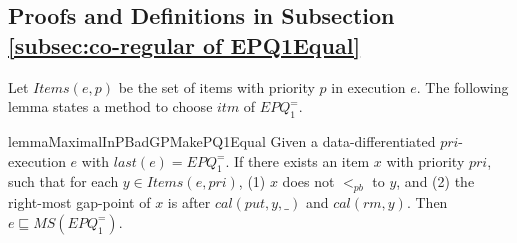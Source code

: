 \subsection{Proofs and Definitions in Subsection \ref{subsec:co-regular of EPQ1Equal}}
\label{sec:appendix proof and definition in section co-regular of EPQ1Equal}

Let $\textit{Items}(e,p)$ be the set of items with priority $p$ in execution $e$. The following lemma states a method to choose $\textit{itm}$ of $\textit{EPQ}_1^{=}$.

\begin{restatable}{lemma}{MaximalInPBadGPMakePQ1Equal}
\label{lemma:maximal in pb and gap-point make a candidate of EPQ1Equal}
Given a data-differentiated $\textit{pri}$-execution $e$ with $\textit{last}(e) = \textit{EPQ}_1^{=}$. If there exists an item $x$ with priority $\textit{pri}$, such that for each $y \in \textit{Items}(e,\textit{pri})$, (1) $x$ does not $<_{\textit{pb}}$ to $y$, and (2) the right-most gap-point of $x$ is after $\textit{cal}(\textit{put},y,\_)$ and $\textit{cal}(\textit{rm},y)$. Then $e \sqsubseteq \textit{MS}(\textit{EPQ}_1^{=})$.
\end{restatable}

